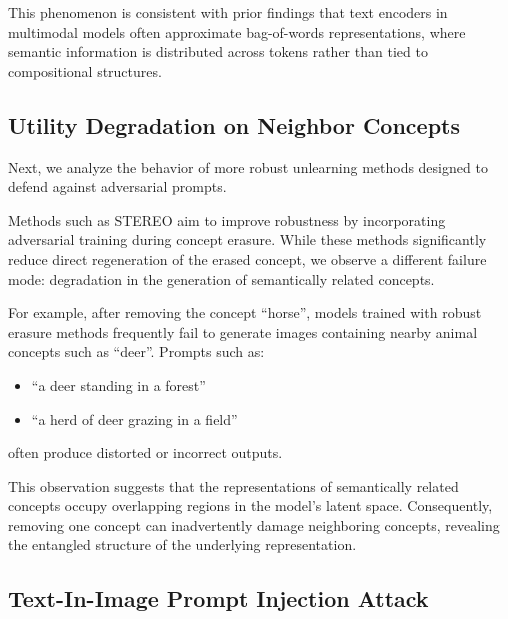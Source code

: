 This phenomenon is consistent with prior findings that text encoders in multimodal models often approximate bag-of-words representations, where semantic information is distributed across tokens rather than tied to compositional structures.

\subsection{Utility Degradation on Neighbor Concepts}


Next, we analyze the behavior of more robust unlearning methods designed to defend against adversarial prompts.

Methods such as STEREO aim to improve robustness by incorporating adversarial training during concept erasure. While these methods significantly reduce direct regeneration of the erased concept, we observe a different failure mode: degradation in the generation of semantically related concepts.

For example, after removing the concept ``horse'', models trained with robust erasure methods frequently fail to generate images containing nearby animal concepts such as ``deer''. Prompts such as:

\begin{itemize}
\item ``a deer standing in a forest''
\item ``a herd of deer grazing in a field''
\end{itemize}

often produce distorted or incorrect outputs.

This observation suggests that the representations of semantically related concepts occupy overlapping regions in the model's latent space. Consequently, removing one concept can inadvertently damage neighboring concepts, revealing the entangled structure of the underlying representation.

\subsection{Text-In-Image Prompt Injection Attack}


